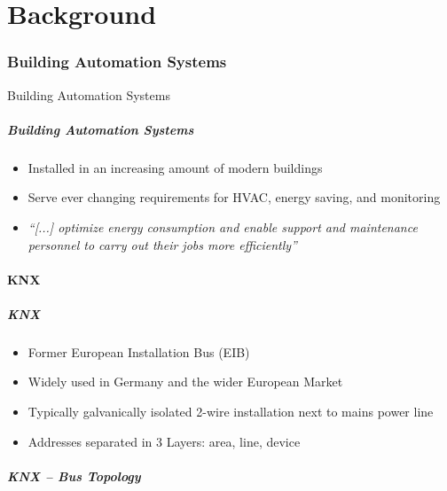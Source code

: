 \part{Background}
\label{part:back}

\section{Building Automation Systems}
\begin{frame}[c]
	\centering
	\LARGE Building Automation Systems
\end{frame}

\begin{frame}[c]
	\frametitle{Building Automation Systems}
	\begin{itemize}
		\item Installed in an increasing amount of modern buildings
		\item Serve ever changing requirements for HVAC, energy saving, and monitoring
		\item \textit{\enquote{[...] optimize energy consumption and enable support and maintenance personnel to carry out their jobs more efficiently}} \parencite{Merz2009}
	\end{itemize}
	
	\note{}
\end{frame}

\subsection{KNX}
\begin{frame}[c]
	\frametitle{KNX}
	\begin{itemize}
		\item Former European Installation Bus (EIB)
		\item Widely used in Germany and the wider European Market
		\item Typically galvanically isolated 2-wire installation next to mains power line
		\item Addresses separated in 3 Layers: area, line, device
	\end{itemize}

\end{frame}

\begin{frame}[c]
	\frametitle{KNX -- Bus Topology}
	
	\nocite{Sokollik2017}
	
\end{frame}


